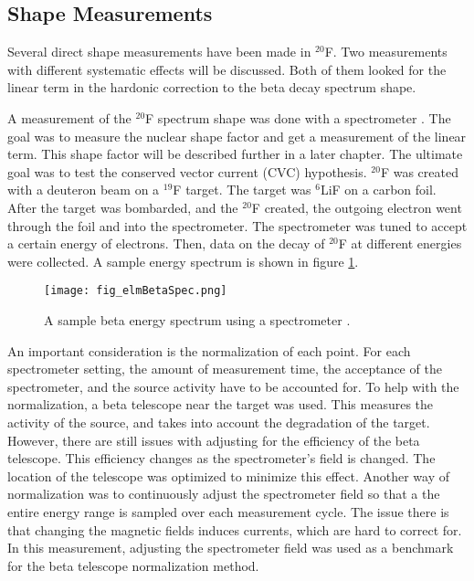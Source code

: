 \documentclass[../MaxHughesThesis.tex]{subfiles}
\begin{document}
\subsection{Shape Measurements} 

Several direct shape measurements have been made in $^{20}$F.
Two measurements with different systematic effects will be discussed.
Both of them looked for the linear term in the hardonic correction to the beta decay spectrum shape. 

A measurement of the $^{20}$F spectrum shape was done with a spectrometer \cite{Elm87}.
The goal was to measure the nuclear shape factor and get a measurement of the linear term.
This shape factor will be described further in a later chapter.
The ultimate goal was to test the conserved vector current (CVC) hypothesis. 
$^{20}$F was created with a deuteron beam on a $^{19}$F target.
The target was $^{6}$LiF on a carbon foil.
After the target was bombarded, and the $^{20}$F created, the outgoing electron went through the foil and into the spectrometer.
The spectrometer was tuned to accept a certain energy of electrons. 
Then, data on the decay of $^{20}$F at different energies were collected.
A sample energy spectrum is shown in figure \ref{fig:elmspec}.

\begin{figure}[!htb]
	\centerline{\texttt{[image: fig\_elmBetaSpec.png]}}
	\caption{A sample beta energy spectrum using a spectrometer \cite{Elm87}.}
	\label{fig:elmspec}
\end{figure}

An important consideration is the normalization of each point.
For each spectrometer setting, the amount of measurement time, the acceptance of the spectrometer, and the source activity have to be accounted for.
To help with the normalization, a beta telescope near the target was used.
This measures the activity of the source, and takes into account the degradation of the target.
However, there are still issues with adjusting for the efficiency of the beta telescope.
This efficiency changes as the spectrometer's field is changed.
The location of the telescope was optimized to minimize this effect.
Another way of normalization was to continuously adjust the spectrometer field so that a the entire energy range is sampled over each measurement cycle.
The issue there is that changing the magnetic fields induces currents, which are hard to correct for. 
In this measurement, adjusting the spectrometer field was used as a benchmark for the beta telescope normalization method.
\end{document}
